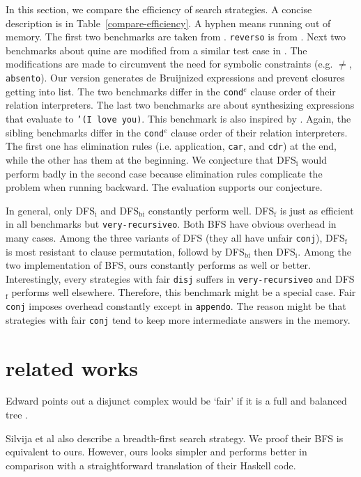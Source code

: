 \documentclass[format=acmlarge, review=true, authordraft=true]{acmart}
\newcommand{\conde}{\texttt{cond$^e$} }
\newcommand{\conj}{\texttt{conj}}
\newcommand{\disj}{\texttt{disj}}
\begin{document}
In this section, we compare the efficiency of search strategies. A concise 
description is in Table~\ref{compare-efficiency}. A hyphen means running out of 
memory. The first two benchmarks are taken from 
\citep{friedman_reasoned_2018}. \texttt{reverso} is from 
\citep{rozplokhas2018improving}. Next two benchmarks 
about quine are modified from a similar test case in \citep{byrd2017unified}. 
The modifications are made 
to circumvent the need for symbolic constraints (e.g. $\neq$, 
\texttt{absento}). Our version generates de 
Bruijnized expressions and prevent closures getting into list. The two 
benchmarks differ in the \conde clause order of their relation interpreters. 
The last two 
benchmarks are about synthesizing expressions that evaluate to \texttt{'(I love 
you)}. This benchmark is also inspired by \citep{byrd2017unified}. Again, the 
sibling benchmarks differ in the \conde clause order of their relation 
interpreters. The first one 
has elimination rules (i.e. application, \texttt{car}, and \texttt{cdr}) at the 
end, while the other has them at the beginning. We conjecture that DFS$_\textrm{i}$ would 
perform badly in the second case because elimination rules complicate the 
problem when running backward. The evaluation supports our conjecture.

In general, only DFS$_\textrm{i}$ and DFS$_\textrm{bi}$ constantly perform well. DFS$_\textrm{f}$ is just as 
efficient in all benchmarks but \texttt{very-recursiveo}. Both BFS have obvious 
overhead in many cases. Among the three variants of DFS (they all have unfair 
\conj{}), DFS$_\textrm{f}$ is most resistant to clause permutation, followd by DFS$_\textrm{bi}$ then 
DFS$_\textrm{i}$. Among the two implementation of BFS, ours constantly performs as well or 
better. Interestingly, every strategies with fair \disj{} suffers in 
\texttt{very-recursiveo} and DFS$_\textrm{f}$ performs well elsewhere. Therefore, this 
benchmark might be a special case. Fair \conj{} imposes overhead constantly 
except in \texttt{appendo}. The reason might be that strategies with fair 
\conj{} tend to keep more intermediate answers in the memory.

\section{related works}

Edward points out a disjunct complex would be `fair' if it is a full and 
balanced tree \citep{yang2010adventures}.

Silvija et al \citep{seres1999algebra} also describe a breadth-first search 
strategy. We proof their BFS is equivalent to ours. However, ours looks simpler 
and performs better in comparison with a straightforward translation of their 
Haskell code.
\end{document}
